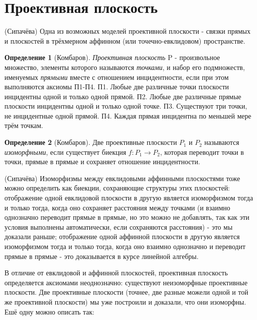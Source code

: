 \documentclass[a4paper, 12pt]{article}
\theoremstyle{definition}
\newtheorem*{definition}{Определение}
\begin{document}
\section{Проективная плоскость}
(Сипачёва) Одна из возможных моделей проективной плоскости - связки прямых и плоскостей в трёхмерном аффинном (или точечно-евклидовом) пространстве.
\begin{definition}[Комбаров]
    \textit{Проективная плоскость} P - произвольное множество, элементы которого называются \textit{точками}, и набор его подмножеств, именуемых \textit{прямыми} вместе с отношением инцидентности, если при этом выполняются аксиомы П1-П4. \newline
    П1. Любые две различные точки плоскости инцидентны одной и только одной прямой. \newline
    П2. Любые две различные прямые плоскости инцидентны одной и только одной точке. \newline
    П3. Существуют три точки, не инцидентные одной прямой. \newline
    П4. Каждая прямая инцидентна по меньшей мере трём точкам.
\end{definition}

\begin{definition}[Комбаров]
    Две проективные плоскости $P_1$ и $P_2$ называются \textit{изоморфными}, если существует биекция $f: P_1 \to P_2$, которая переводит точки в точки, прямые в прямые и сохраняет отношение инцидентности.
\end{definition}

(Сипачёва) Изоморфизмы между евклидовыми аффинными плоскостями тоже можно определить как биекции, сохраняющие структуры этих плоскостей: отображение одной евклидовой плоскости в другую является изоморфизмом тогда и только тогда, когда оно сохраняет расстояния между точками (и взаимно однозначно переводит прямые в прямые, но это можно не добавлять, так как эти условия выполнены автоматически, если сохраняются расстояния) - это мы доказали раньше; отображение одной аффинной плоскости в другую является изоморфизмом тогда и только тогда, когда оно взаимно однозначно и переводит прямые в прямые - это доказывается в курсе линейной алгебры.

В отличие от евклидовой и аффинной плоскостей, проективная плоскость определяется аксиомами неоднозначно: существуют неизоморфные проективные плоскости. Две проективные плоскости (точнее, две разные можели одной и той же проективной плоскости) мы уже построили и доказали, что они изоморфны. Ешё одну можно описать так:
\end{document}
